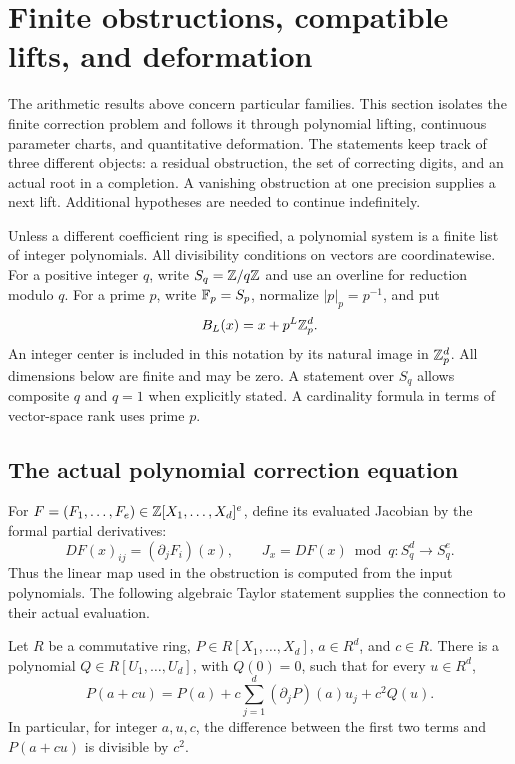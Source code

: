 \section{Finite obstructions, compatible lifts, and deformation}
\label{sec:lifting}

The arithmetic results above concern particular families. This section isolates
the finite correction problem and follows it through polynomial lifting,
continuous parameter charts, and quantitative deformation. The statements keep
track of three different objects: a residual obstruction, the set of correcting
digits, and an actual root in a completion. A vanishing obstruction at one
precision supplies a next lift. Additional hypotheses are needed to continue
indefinitely.

Unless a different coefficient ring is specified, a polynomial system is a
finite list of integer polynomials. All divisibility conditions on vectors are
coordinatewise. For a positive integer $q$, write $S_q=\mathbb Z/q\mathbb Z$ and use an
overline for reduction modulo $q$. For a prime $p$, write
$\mathbb F_p=S_p$, normalize $|p|_p=p^{-1}$, and put
\[
 B_L(x)=x+p^L\mathbb Z_p^d.
\]
An integer center is included in this notation by its natural image in
$\mathbb Z_p^d$. All dimensions below are finite and may be zero. A statement over
$S_q$ allows composite $q$ and $q=1$ when explicitly stated. A cardinality
formula in terms of vector-space rank uses prime $p$.

\subsection{The actual polynomial correction equation}

For $F=(F_1,\ldots,F_e)\in\mathbb Z[X_1,\ldots,X_d]^e$, define its evaluated
Jacobian by the formal partial derivatives:
\[
 DF(x)_{ij}=(\partial_jF_i)(x),\qquad
 J_x=DF(x)\bmod q:S_q^d\longrightarrow S_q^e.
\]
Thus the linear map used in the obstruction is computed from the input
polynomials. The following algebraic Taylor statement supplies the connection
to their actual evaluation.

\begin{lemma}\label{lem:polynomial-taylor}
Let $R$ be a commutative ring, $P\in R[X_1,\ldots,X_d]$, $a\in R^d$, and
$c\in R$. There is a polynomial $Q\in R[U_1,\ldots,U_d]$, with $Q(0)=0$,
such that for every $u\in R^d$,
\begin{equation}\label{eq:polynomial-taylor}
 P(a+cu)=P(a)+c\sum_{j=1}^d(\partial_jP)(a)u_j+c^2Q(u).
\end{equation}
In particular, for integer $a,u,c$, the difference between the first two
terms and $P(a+cu)$ is divisible by $c^2$.
\end{lemma}

